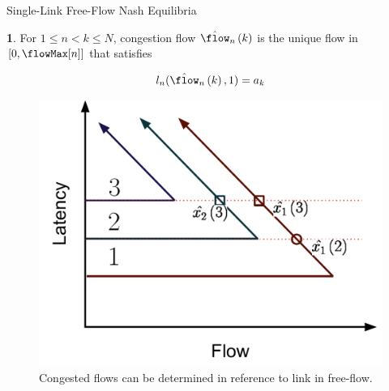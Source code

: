 \documentclass[english, smaller]{beamer}
\theoremstyle{plain}
\theoremstyle{definition}
\newtheorem{defn}[thm]{\protect\definitionname}
\theoremstyle{plain}
\theoremstyle{plain}
\providecommand{\definitionname}{Definition}
\begin{document}
\begin{frame}{Single-Link Free-Flow Nash Equilibria}
\begin{defn}
For $1\leq n<k\leq N$, congestion flow $\cffFlow nk$ is the unique
flow in $[0,\flowMax[n]]$ that satisfies

\[
l_{n}(\cffFlow nk,1)=a_{k}
\]

\end{defn}
\begin{figure}
\begin{centering}
\includegraphics[scale=0.25]{../../figures/presentation/DefinitionXHat}
\par\end{centering}

\caption{Congested flows can be determined in reference to link in free-flow.}
\end{figure}



\end{frame}
\end{document}
